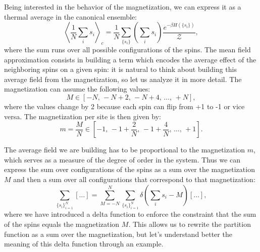 Being interested in the behavior of the magnetization, we can express it as a thermal average in the canonical ensemble:
\[
    \left\langle \frac{1}{N} \sum_{i} s_i \right\rangle_c = \frac{1}{N} \sum_{\{s_i\}} \left( \sum_{i} s_i \right) \frac{e^{-\beta H(\{s_i\})}}{\mathcal{Z}},
\]
where the sum runs over all possible configurations of the spins. The mean field approximation consists in building a term which encodes the average effect of the neighboring spins on a given spin: it is natural to think about building this average field from the magnetization, so let us analyze it in more detail. The magnetization can assume the following values:
\[
    M \in \left[ -N,\, -N+2,\, -N+4,\, \ldots,\, +N \right],
\]
where the values change by 2 because each spin can flip from +1 to -1 or vice versa. The magnetization per site is then given by:
\[
    m = \frac{M}{N} \in \left[ -1,\, -1 + \frac{2}{N},\, -1 + \frac{4}{N},\, \ldots,\, +1 \right].
\]

The average field we are building has to be proportional to the magnetization \(m\), which serves as a measure of the degree of order in the system. Thus we can express the sum over configurations of the spins as a sum over the magnetization \(M\) and then a sum over all configurations that correspond to that magnetization:
\[
    \sum_{\{s_i\}_{i=1}^N} [\dots] = \sum_{M=-N}^{N} \sum_{\{s_i\}_{i=1}^N} \delta\left(\sum_{i} s_i - M\right)[\dots],
\]
where we have introduced a delta function to enforce the constraint that the sum of the spins equals the magnetization \(M\). This allows us to rewrite the partition function as a sum over the magnetization, but let's understand better the meaning of this delta function through an example.

